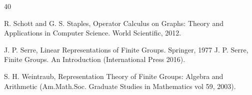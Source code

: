 \documentclass[preprint,12pt,authoryear]{elsarticle}
\theoremstyle{definition}
\begin{document}
\begin{thebibliography}{40}

R. Schott and G. S. Staples,  Operator Calculus on Graphs: Theory and Applications in Computer Science. World Scientific, 2012.


 J.  P. Serre,  Linear Representations of Finite Groups. Springer, 1977
J.  P. Serre, Finite Groups. An Introduction (International Press 2016).

S. H. Weintraub, Representation Theory of Finite Groups: Algebra and Arithmetic (Am.Math.Soc.  Graduate Studies in Mathematics vol 59, 2003).



\end{thebibliography}
\end{document}
